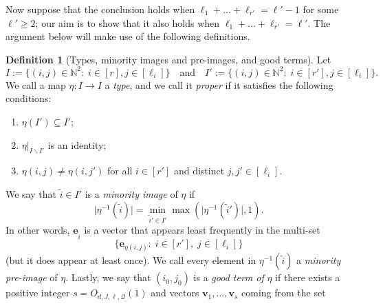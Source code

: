 \documentclass[11pt]{amsart}
\theoremstyle{definition}
\newtheorem{definition}[lemma]{Definition}
\newcommand{\N}{{\mathbb N}}
\newcommand{\CQ}{{\mathcal Q}}
\newcommand{\be}{{\mathbf{e}}}
\newcommand{\bv}{{\mathbf{v}}}
\newcommand{\1}{{\mathbf{1}}}
\begin{document}
Now suppose that the conclusion holds when $\ell_{1}+\dots+\ell_{r'}=\ell'-1$ for some $\ell'\geq 2$; our aim is to show that it also holds when $\ell_{1}+\dots+\ell_{r'}=\ell'$. The argument below will make use of the following definitions.
\begin{definition}[Types, minority images and pre-images, and good terms]
    Let $$I:=\{(i,j)\in\N^{2}\colon\; i\in[r], j\in[\ell_{i}]\}\quad \text{and}\quad I':=\{(i,j)\in\N^{2}\colon\; i\in[r'], j\in[\ell_{i}]\}.$$
    We call a map $\eta\colon I\to I$ a \textit{type}, and we call it \emph{proper} if it satisfies the following conditions:
    \begin{enumerate}
        \item $\eta(I') \subseteq I'$;
        \item $\eta|_{I\backslash I'}$ is an identity;
        \item $\eta(i,j)\neq \eta(i,j')$ for all $i\in[r']$ and distinct $ j,j'\in[\ell_{i}]$.
    \end{enumerate}
    We say that $\tilde{i}\in I'$ is a \emph{minority image} of $\eta$ if
   $$\vert \eta^{-1}(\tilde{i})\vert=\min_{\tilde{i}'\in I'}\max(\vert\eta^{-1}(\tilde{i}')\vert,1).$$
   In other words, $\be_{\tilde{i}}$ is a vector  that appears least frequently in the multi-set $$\{\be_{\eta(i,j)}\colon\; i\in[r'],\; j\in [\ell_{i}]\}$$
(but it does appear at least once). We call every element in $\eta^{-1}(\tilde{i})$ a \emph{minority pre-image} of $\eta$. %
   Lastly, we say that $(i_{0},j_{0})$ is a \emph{good term of} $\eta$  if
   there exists a positive integer $s=O_{d,J,\ell,\CQ}(1)$ and vectors $\bv_{1},\dots,\bv_{s}$ coming from the set

\end{definition}
\end{document}
